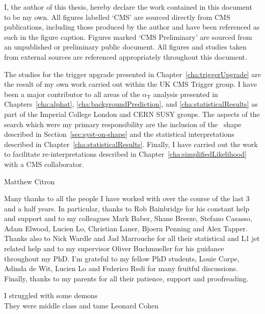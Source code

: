 \begin{declaration}
I, the author of this thesis, hereby declare the work contained in this 
document to be my own. All figures labelled `CMS' are sourced directly from CMS publications, 
including those produced by the author and have been referenced as such 
in the figure caption. Figures marked `CMS Preliminary' are sourced from an unpublished 
or preliminary public document. All figures and studies taken from external sources are referenced appropriately 
throughout this document.

The studies for the trigger upgrade presented in Chapter~\ref{cha:triggerUpgrade} are 
the result of my own work carried out within the UK CMS Trigger group. I have
been a major contributor to all areas of the $\alpha_\text{T}$ 
analysis presented in Chapters~\ref{cha:alphat}, \ref{cha:backgroundPrediction}, 
and \ref{cha:statisticalResults} as part of the Imperial College London and CERN SUSY groups.
The aspects of the search which were my primary responsibility are
the inclusion of the \mht~shape described in Section~\ref{sec:syst-on-shape} 
and the statistical interpretations described in Chapter~\ref{cha:statisticalResults}.
Finally, I have carried out the work to facilitate re-interpretations described in 
Chapter~\ref{cha:simplifiedLikelihood} with a CMS collaborator.
  \begin{flushright}
    Matthew Citron
  \end{flushright}
\end{declaration}


\begin{acknowledgements}

Many thanks to all the people I have worked with over the course of the last 3 and a half years.
In particular, thanks to Rob Bainbridge for his constant help and support and to my 
\alphat colleagues Mark Baber, Shane Breeze, Stefano Casasso, Adam Elwood, Lucien Lo, Christian Laner, Bjoern Penning
and Alex Tapper. Thanks also to Nick Wardle and Jad Marrouche for all their statistical and L1 jet
related help and to my supervisor Oliver Buchmueller for his guidance
throughout my PhD. I'm grateful to my fellow PhD students, Louie Corpe, Adinda de Wit, Lucien Lo and Federico Redi
for many fruitful discussions. Finally, thanks to my parents for all their patience, support and proofreading.

\end{acknowledgements}



\tableofcontents

\listoffigures
\listoftables
\frontquote%
  {I struggled with some demons\\ They were middle class and tame}
  {Leonard Cohen}
